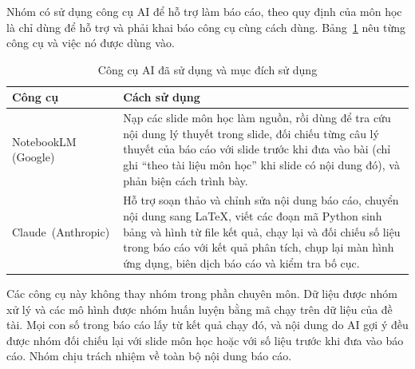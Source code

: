Nhóm có sử dụng công cụ AI để hỗ trợ làm báo cáo, theo quy định của môn học là chỉ dùng để hỗ trợ và phải khai báo công cụ cùng cách dùng. Bảng~\ref{tab:khaibaoai} nêu từng công cụ và việc nó được dùng vào.

\begin{table}[!htbp]
\centering
\caption{Công cụ AI đã sử dụng và mục đích sử dụng}
\label{tab:khaibaoai}
\footnotesize
\begin{tabular}{p{3.5cm}p{11.5cm}}
\toprule
Công cụ & Cách sử dụng \\
\midrule
NotebookLM (Google) & Nạp các slide môn học làm nguồn, rồi dùng để tra cứu nội dung lý thuyết trong slide, đối chiếu từng câu lý thuyết của báo cáo với slide trước khi đưa vào bài (chỉ ghi ``theo tài liệu môn học'' khi slide có nội dung đó), và phản biện cách trình bày. \\
\mbox{Claude (Anthropic)} & Hỗ trợ soạn thảo và chỉnh sửa nội dung báo cáo, chuyển nội dung sang LaTeX, viết các đoạn mã Python sinh bảng và hình từ file kết quả, chạy lại và đối chiếu số liệu trong báo cáo với kết quả phân tích, chụp lại màn hình ứng dụng, biên dịch báo cáo và kiểm tra bố cục. \\
\bottomrule
\end{tabular}
\end{table}

Các công cụ này không thay nhóm trong phần chuyên môn. Dữ liệu được nhóm xử lý và các mô hình được nhóm huấn luyện bằng mã chạy trên dữ liệu của đề tài. Mọi con số trong báo cáo lấy từ kết quả chạy đó, và nội dung do AI gợi ý đều được nhóm đối chiếu lại với slide môn học hoặc với số liệu trước khi đưa vào báo cáo. Nhóm chịu trách nhiệm về toàn bộ nội dung báo cáo.
